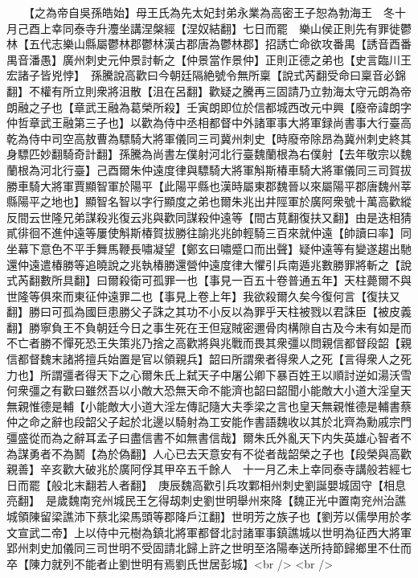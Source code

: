 　　【之為帝自吳孫皓始】母王氏為先太妃封弟永業為高密王子恕為勃海王　冬十月己酉上幸同泰寺升灋坐講涅槃經【涅奴結翻】七日而罷　樂山侯正則先有罪徙鬱林【五代志樂山縣屬鬱林郡鬱林漢古郡唐為鬱林郡】招誘亡命欲攻番禺【誘音酉番禺音潘愚】廣州刺史元仲景討斬之【仲景當作景仲】正則正德之弟也【史言臨川王宏諸子皆兇悖】　孫騰說高歡曰今朝廷隔絶號令無所稟【說式芮翻受命曰稟音必錦翻】不權有所立則衆將沮散【沮在呂翻】歡疑之騰再三固請乃立勃海太守元朗為帝朗融之子也【章武王融為葛榮所殺】壬寅朗即位於信都城西改元中興【廢帝諱朗字仲哲章武王融第三子也】以歡為侍中丞相都督中外諸軍事大將軍録尚書事大行臺高乾為侍中司空高敖曹為驃騎大將軍儀同三司冀州刺史【時廢帝除昂為冀州刺史終其身驃匹妙翻騎奇計翻】孫騰為尚書左僕射河北行臺魏蘭根為右僕射【去年敬宗以魏蘭根為河北行臺】己酉爾朱仲遠度律與驃騎大將軍斛斯椿車騎大將軍儀同三司賀拔勝車騎大將軍賈顯智軍於陽平【此陽平縣也漢時屬東郡魏晉以來屬陽平郡唐魏州莘縣陽平之地也】顯智名智以字行顯度之弟也爾朱兆出井陘軍於廣阿衆號十萬高歡縱反間云世隆兄弟謀殺兆復云兆與歡同謀殺仲遠等【間古莧翻復扶又翻】由是迭相猜貳徘徊不進仲遠等屢使斛斯椿賀拔勝往諭兆兆帥輕騎三百來就仲遠【帥讀曰率】同坐幕下意色不平手舞馬鞭長嘯凝望【鄭玄曰嘯蹙口而出聲】疑仲遠等有變遂趨出馳還仲遠遣椿勝等追曉說之兆執椿勝還營仲遠度律大懼引兵南遁兆數勝罪將斬之【說式芮翻數所具翻】曰爾殺衛可孤罪一也【事見一百五十卷普通五年】天柱薨爾不與世隆等俱來而東征仲遠罪二也【事見上卷上年】我欲殺爾久矣今復何言【復扶又翻】勝曰可孤為國巨患勝父子誅之其功不小反以為罪乎天柱被戮以君誅臣【被皮義翻】勝寧負王不負朝廷今日之事生死在王但寇賊密邇骨肉構隙自古及今未有如是而不亡者勝不憚死恐王失策兆乃捨之高歡將與兆戰而畏其衆彊以問親信都督段韶【親信都督魏末諸將擅兵始置是官以領親兵】韶曰所謂衆者得衆人之死【言得衆人之死力也】所謂彊者得天下之心爾朱氏上弑天子中屠公卿下暴百姓王以順討逆如湯沃雪何衆彊之有歡曰雖然吾以小敵大恐無天命不能濟也韶曰韶聞小能敵大小道大淫皇天無親惟德是輔【小能敵大小道大淫左傳記隨大夫季梁之言也皇天無親惟德是輔書蔡仲之命之辭也段韶父子起於北邊以騎射為工安能作書語魏收以其於北齊為勳戚宗門彊盛從而為之辭耳孟子曰盡信書不如無書信哉】爾朱氏外亂天下内失英雄心智者不為謀勇者不為鬭【為於偽翻】人心已去天意安有不從者哉韶榮之子也【段榮與高歡親善】辛亥歡大破兆於廣阿俘其甲卒五千餘人　十一月乙未上幸同泰寺講般若經七日而罷【般北末翻若人者翻】　庚辰魏高歡引兵攻鄴相州刺史劉誕嬰城固守【相息亮翻】　是歲魏南兖州城民王乞得刼刺史劉世明舉州來降【魏正光中置南兖州治譙城領陳留梁譙沛下蔡北梁馬頭等郡降戶江翻】世明芳之族子也【劉芳以儒學用於孝文宣武二帝】上以侍中元樹為鎮北將軍都督北討諸軍事鎮譙城以世明為征西大將軍郢州刺史加儀同三司世明不受固請北歸上許之世明至洛陽奉送所持節歸鄉里不仕而卒【陳力就列不能者止劉世明有焉劉氏世居彭城】<br />
<br />
